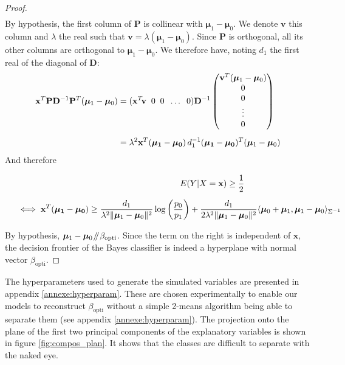 \documentclass[preprint,12pt]{elsarticle}
\newcommand{\parallelsum}{\mathbin{\!/\mkern-5mu/\!}}
\begin{document}
\begin{proof}
\begin{align}
\end{align}
By hypothesis, the first column of $\mathbf{P}$ is collinear with $\bm{\mu}_1 - \bm{\mu}_0$. We denote $\mathbf{v}$ this column and $\lambda$ the real such that $\mathbf{v} = \lambda (\bm{\mu}_1 - \bm{\mu}_0)$. Since $\mathbf{P}$ is orthogonal, all its other columns are orthogonal to $\bm{\mu}_1 - \bm{\mu}_0$. We therefore have, noting $d_1$ the first real of the diagonal of $\mathbf{D}$:
\begin{align}
    \mathbf{x}^T\mathbf{P}\mathbf{D}^{-1}\mathbf{P}^T(\bm{\mu}_1 - \bm{\mu}_0) &= (\mathbf{x}^T \hspace{-2 pt}\mathbf{v} \; \; 0 \; \; 0 \; \;\hdots \; \; 0) \mathbf{D}^{-1} \begin{pmatrix}
        \mathbf{v}^T(\bm{\mu}_1 - \bm{\mu}_0) \\
        0 \\
        0 \\
        \vdots \\
        0
        \end{pmatrix}\\[5 pt]
    &= \lambda^2\mathbf{x}^T (\mathbf{\bm{\mu}_1 - \bm{\mu}_0}) \, d_1^{-1} (\mathbf{\bm{\mu}_1 - \bm{\mu}_0})^T(\bm{\mu}_1 - \bm{\mu}_0)
\end{align}
And therefore

\begin{align}
    E(Y|X = \mathbf{x}) \geq \frac{1}{2} \hspace{2 cm} \phantom{2} & \\[5 pt]
    \iff  \mathbf{x}^T (\mathbf{\bm{\mu}_1 - \bm{\mu}_0})  \geq  \frac{d_1}{ \lambda^2\lVert\bm{\mu}_1 - \bm{\mu}_0 \rVert^2}\log\left(\frac{p_0}{p_1} \right) + \frac{d_1}{2 \lambda^2\lVert\bm{\mu}_1 - \bm{\mu}_0 \rVert^2}\langle \bm{\mu}_0 + \bm{\mu}_1 , \bm{\mu}_1 - \bm{\mu}_0\rangle_{\Sigma^{-1}} \hspace{-2 cm} \phantom{2} &\\[5 pt]
\end{align}
By hypothesis, $\bm{\mu}_1 - \bm{\mu}_0 \parallelsum \beta_{\text{opti}}$. Since the term on the right is independent of $\mathbf{x}$, the decision frontier of the Bayes classifier is indeed a hyperplane with normal vector $\beta_{\text{opti}}$.
\end{proof}

The hyperparameters used to generate the simulated variables are presented in appendix \ref{annexe:hyperparam}. These are chosen experimentally to enable our models to reconstruct $\beta_{\text{opti}}$ without a simple 2-means algorithm being able to separate them (see appendix \ref{annexe:hyperparam}). The projection onto the plane of the first two principal components of the explanatory variables is shown in figure \ref{fig:compos_plan}. It shows that the classes are difficult to separate with the naked eye.
\end{document}
